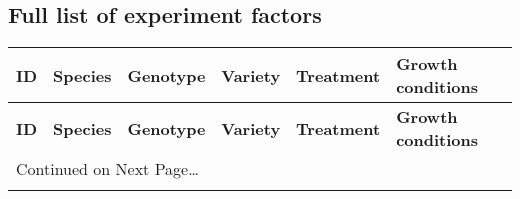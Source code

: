 		\subsection{Full list of experiment factors}
		\begin{center}
		\begin{longtable}{|p{0.7cm}|p{2.2cm}|p{2.2cm}|p{2.2cm}|p{2.2cm}|p{2.2cm}|}
		
		
		\hline
		{\textbf{ID}} & 
		{\textbf{Species}} & 
		{\textbf{Genotype}} & 
		{\textbf{Variety}} &
		{\textbf{Treatment}} & 
		{\textbf{Growth conditions}}
		\tabularnewline
		\hline
		\hline
		\endfirsthead
		
		
		\hline
		{\textbf{ID}} & 
		{\textbf{Species}} & 
		{\textbf{Genotype}} & 
		{\textbf{Variety}} &
		{\textbf{Treatment}} & 
		{\textbf{Growth conditions}}
		\tabularnewline
		\hline
		\hline
		\endhead
		
		
		\multicolumn{6}{l}{{Continued on Next Page\ldots}} 
		\tabularnewline
		\endfoot
		
		
		\hline \hline
		\endlastfoot
		

\end{longtable}
\end{center}
